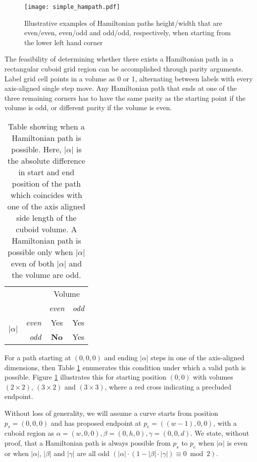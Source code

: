 \begin{figure}[h]
  \centering
  \texttt{[image: simple\_hampath.pdf]}
  \caption{ Illustrative examples of Hamiltonian paths height/width that are even/even, even/odd and odd/odd, respectively,
            when starting from the lower left hand corner }
  \label{fig:exampleHampath}
\end{figure}


The feasibility of determining whether there exists a Hamiltonian path in a rectangular cuboid
grid region can be accomplished through parity arguments.
Label grid cell points in a volume as 0 or 1,
alternating between labels with every axis-aligned single step move.
Any Hamiltonian path that ends at one of the three remaining corners has to have the same parity as the starting point if the
volume is odd, or different parity if the volume is even.

\begin{table}[h]
  \centering
  \begin{tabular}[t]{cr|cc}
    \multicolumn{2}{c}{ \multirow{2}{*}{Path Possible} } & \multicolumn{2}{c}{Volume} \\
    & & \textit{even} & \textit{odd} \\
    \hline
      \multirow{2}{*}{ $|\alpha|$ } & \textit{even} & Yes & Yes \\
       & \textit{odd} & \textbf{No} & Yes \\
     \hline
  \end{tabular}
  \caption{ Table showing when a Hamiltonian path is possible. Here, $|\alpha|$ is the absolute difference in start and end position of the path which
            coincides with one of the axis aligned side length of the cuboid volume. A Hamiltonian path is possible only when $|\alpha|$ even of both
            $|\alpha|$ and the volume are odd. }
  \label{table:pathTable}
\end{table}


For a path starting at $(0,0,0)$ and ending $|\alpha|$ steps in one of the axis-aligned dimensions,
then Table \ref{table:pathTable} enumerates this condition under which a valid path is possible.
Figure \ref{fig:exampleHampath} illustrates this for starting position $(0,0)$ with volumes $(2 \times 2)$, $(3 \times 2)$ and $(3 \times 3)$,
where a red cross indicating a precluded endpoint.

Without loss of generality, we will assume a curve starts from position $p_s=(0,0,0)$ and has proposed
endpoint at $p_e=((w-1),0,0)$, with a cuboid region as $\alpha = (w,0,0), \beta = (0,h,0), \gamma = (0,0,d)$.
We state, without proof, that
a Hamiltonian path is always possible from $p_s$ to $p_e$ when $|\alpha|$ is even or when $|\alpha|$, $|\beta|$ and $|\gamma|$
are all odd  $(|\alpha| \cdot (1 - |\beta| \cdot |\gamma|) \equiv 0 \bmod 2)$.

